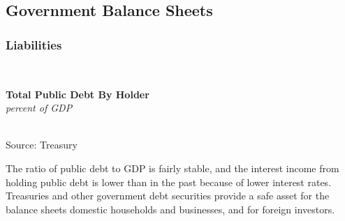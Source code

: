 \documentclass{report}
\makeatletter
\newcommand{\tbllink}[1]{\href{https://raw.githubusercontent.com/bdecon/US-chartbook/master/chartbook/data/#1}{\faTable}}
\newcommand*\short[1]{\expandafter\@gobbletwo\number\numexpr#1\relax}
\newcommand{\sbar}[4]{
		\addplot[ybar stacked, bar width=2.6pt, draw opacity=0, fill=#1] 
			table [x=#2, y=#3, col sep=comma]{#4};}
\newcommand{\dateaxisticks}{
		date coordinates in=x, axis line style={draw=none},
		xmax={2020-05-10},
		max space between ticks=40,	    
		xtick={{1990-01-01}, {1992-01-01}, {1994-01-01}, 
			{1996-01-01}, {1998-01-01}, {2000-01-01}, 
			{2002-01-01}, {2004-01-01}, {2006-01-01},
			{2008-01-01}, {2010-01-01}, {2012-01-01}, {2014-01-01},
		    {2016-01-01}, {2018-01-01}, {2020-01-01}},
		minor xtick={{1989-01-01}, {1991-01-01}, {1993-01-01},
			{1995-01-01}, {1997-01-01}, {1999-01-01}, 
			{2001-01-01}, {2003-01-01}, {2005-01-01}, {2007-01-01},
		    {2009-01-01}, {2011-01-01}, {2013-01-01}, {2015-01-01},
		    {2017-01-01}, {2019-01-01}},
		enlarge y limits={0.06}, enlarge x limits={0.01},
		}
\newcommand{\bbar}[2]{extra #1 ticks = {{#2}}, extra #1 tick labels = ,
		extra #1 tick style = {grid=major, grid style={thick, black!25}},}
\newcommand{\rbars}{
		\fill[color=black!10] (axis cs:{1990-07-01},\pgfkeysvalueof{/pgfplots/ymin}) rectangle 
			(axis cs:{1991-03-01}, \pgfkeysvalueof{/pgfplots/ymax});
		\fill[color=black!10] (axis cs:{2007-12-01},\pgfkeysvalueof{/pgfplots/ymin}) rectangle 
			(axis cs:{2009-07-01}, \pgfkeysvalueof{/pgfplots/ymax});
		\fill[color=black!10] (axis cs:{2001-03-01},\pgfkeysvalueof{/pgfplots/ymin}) rectangle 
			(axis cs:{2001-11-01}, \pgfkeysvalueof{/pgfplots/ymax});}
\makeatother
\begin{document}
{{{{{{{\begin{minipage}{0.76\textwidth}
\end{minipage}


\newpage
\subsection*{\color{black!70} \seriffont Government Balance Sheets}

\subsubsection*{\color{black!70} \seriffont Liabilities}

\begin{minipage}{0.76\textwidth}

\small \\

\vspace{2mm}

\noindent \normalsize \textbf{Total Public Debt By Holder}\\
\footnotesize{\textit{percent of GDP}}\\
\noindent \hspace*{-2mm} \\
\footnotesize{Source: Treasury} \hfill \tbllink{pubdebt.csv}\\

\vspace{2mm}

\small The ratio of public debt to GDP is fairly stable, and the interest income from holding public debt is lower than in the past because of lower interest rates. Treasuries and other government debt securities provide a safe asset for the balance sheets domestic households and businesses, and for foreign investors.

\end{minipage}

}}}}}}}
\end{document}
